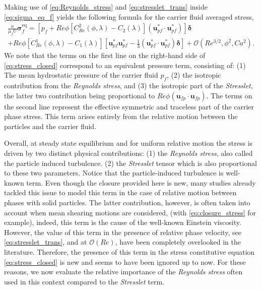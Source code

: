 Making use of \ref{eq:Reynolds_stress} and \ref{eq:stresslet_trans} inside \ref{eq:sigma_eq_f} yields the following formula for the carrier fluid averaged stress, 
\begin{multline}
    \frac{a }{\mu_f U}\bm{\sigma}^\text{eq}_f = 
    \left[ p_f + Re \phi  [C_{Re}^2(\phi,\lambda) - C_2(\lambda)](\textbf{u}_{pf}^*\cdot \textbf{u}_{pf}^*) \right]\bm\delta \\
    + Re \phi [C_{Re}^1(\phi,\lambda) - C_1(\lambda)]\left[
            \textbf{u}_{pf}^*\textbf{u}_{pf}^*
            - \frac{1}{3}(\textbf{u}_{pf}^*\cdot \textbf{u}_{pf}^*)\bm\delta
    \right]
    + \mathcal{O}(Re^{3/2},\phi^2, Ca^2 ).
    \label{eq:stress_closed}
\end{multline} 
We note that the terms on the first line on the right-hand side of \ref{eq:stress_closed} correspond to an equivalent pressure term, consisting of:  
(1) The mean hydrostatic pressure of the carrier fluid $p_f$, 
(2) the isotropic contribution from the \textit{Reynolds stress}, and 
(3) the isotropic part of the \textit{Stresslet}, the latter two contribution being proportional to $Re \phi (\textbf{u}_{fp}\cdot \textbf{u}_{fp})$.  
The terms on the second line represent the effective symmetric and traceless part of the carrier phase stress. 
This term arises entirely from the relative motion between the particles and the carrier fluid. 



Overall, at steady state equilibrium and for uniform relative motion the stress is driven by two distinct physical contributions: 
(1) the \textit{Reynolds stress}, also called the particle induced turbulence. 
(2) the \textit{Stresslet} tensor which is also proportional to these two parameters. 
Notice that the particle-induced turbulence is well-known term. 
Even though the closure provided here is new, many studies already tackled this issue to model this term in the case of relative motion between phases with solid particles. 
The latter contribution, however, is often taken into account when mean shearing motions are considered, (with \ref{eq:closure_stress} for example), indeed, this term is the cause of the well-known Einstein viscosity. 
However, the value of this term in the presence of relative phase velocity, see \ref{eq:stresslet_trans},  and at $\mathcal{O}(Re)$, have been completely overlooked in the literature. 
Therefore, the presence of this term in the stress constitutive equation \eqref{eq:stress_closed}  is new and seems to have been ignored up to now. 
For these reasons, we now evaluate the relative importance of the \textit{Reynolds stress} often used in this context compared to the \textit{Stresslet} term. 

